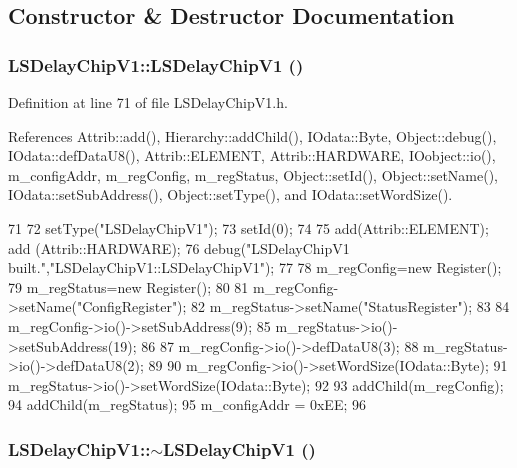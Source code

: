 \subsection{Constructor \& Destructor Documentation}
\hypertarget{classLSDelayChipV1_a4dbc01a273a6e044b6f163e12e136134}{
\subsubsection[{LSDelayChipV1}]{\setlength{\rightskip}{0pt plus 5cm}LSDelayChipV1::LSDelayChipV1 ()}}
\label{classLSDelayChipV1_a4dbc01a273a6e044b6f163e12e136134}


Definition at line 71 of file LSDelayChipV1.h.

References Attrib::add(), Hierarchy::addChild(), IOdata::Byte, Object::debug(), IOdata::defDataU8(), Attrib::ELEMENT, Attrib::HARDWARE, IOobject::io(), m\_\-configAddr, m\_\-regConfig, m\_\-regStatus, Object::setId(), Object::setName(), IOdata::setSubAddress(), Object::setType(), and IOdata::setWordSize().


\begin{DoxyCode}
71                    {
72         setType("LSDelayChipV1");
73         setId(0);
74 
75         add(Attrib::ELEMENT); add (Attrib::HARDWARE);
76         debug("LSDelayChipV1 built.","LSDelayChipV1::LSDelayChipV1");
77 
78         m_regConfig=new Register();
79         m_regStatus=new Register();
80 
81         m_regConfig->setName("ConfigRegister");
82         m_regStatus->setName("StatusRegister");
83 
84         m_regConfig->io()->setSubAddress(9);    
85         m_regStatus->io()->setSubAddress(19);
86 
87         m_regConfig->io()->defDataU8(3);    
88         m_regStatus->io()->defDataU8(2);
89 
90         m_regConfig->io()->setWordSize(IOdata::Byte);
91         m_regStatus->io()->setWordSize(IOdata::Byte);
92 
93         addChild(m_regConfig);
94         addChild(m_regStatus);
95         m_configAddr = 0xEE;
96     }
\end{DoxyCode}
\hypertarget{classLSDelayChipV1_a86c96f60b9be6f35745536df46919817}{
\subsubsection[{$\sim$LSDelayChipV1}]{\setlength{\rightskip}{0pt plus 5cm}LSDelayChipV1::$\sim$LSDelayChipV1 ()}}
\label{classLSDelayChipV1_a86c96f60b9be6f35745536df46919817}


